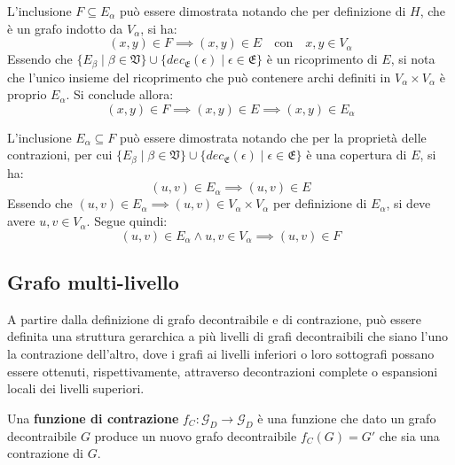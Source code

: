 L'inclusione $F \subseteq E_\alpha$ pu\`o essere dimostrata notando che per definizione di $H$,
che \`e un grafo indotto da $V_\alpha$, si ha:
\begin{equation*}
(x, y) \in F \implies (x, y) \in E \quad \text{con} \quad x, y \in V_{\alpha}
\end{equation*}
Essendo che $\{ E_\beta \mid \beta \in \mathfrak{V}\}
\cup \{ dec_{\mathfrak{E}}(\epsilon) \mid \epsilon \in \mathfrak{E}\}$ \`e un ricoprimento di $E$, si nota che
l'unico insieme del ricoprimento che pu\`o contenere archi definiti in $V_\alpha \times V_\alpha$
\`e proprio $E_\alpha$. Si conclude allora:
\begin{equation*}
(x, y) \in F \implies (x, y) \in E \implies (x, y) \in E_\alpha
\end{equation*}

L'inclusione $E_\alpha \subseteq F$ pu\`o essere dimostrata notando che per la propriet\`a delle contrazioni,
per cui $\{ E_\beta \mid \beta \in \mathfrak{V}\} \cup
\{dec_{\mathfrak{E}}(\epsilon) \mid \epsilon \in \mathfrak{E}\} $ \`e una copertura di $E$, si ha:
\begin{equation*}
    (u, v) \in E_\alpha \implies (u, v) \in E
\end{equation*}
Essendo che  $(u, v) \in E_\alpha \implies (u, v) \in V_\alpha \times V_\alpha$ per definizione di $E_\alpha$, si
deve avere $u, v \in V_\alpha$. Segue quindi:
\begin{equation*}
(u, v) \in E_\alpha \land u,v \in V_\alpha \implies (u, v) \in F
\end{equation*}

\newpage

\subsection{Grafo multi-livello}\label{subsec:grafo-multi-livello}

A partire dalla definizione di grafo decontraibile e di contrazione, pu\`o essere definita una struttura gerarchica
a pi\`u livelli di grafi decontraibili che siano l'uno la contrazione dell'altro, dove i grafi ai livelli inferiori
o loro sottografi possano essere ottenuti, rispettivamente, attraverso decontrazioni complete o espansioni locali
dei livelli superiori.


\begin{definition} 
Una \textbf{funzione di contrazione} $f_C : \mathcal{G}_D \rightarrow \mathcal{G}_D$ \`e una funzione che dato un
grafo decontraibile $G$ produce un nuovo grafo decontraibile $f_C(G) = G'$ che sia una contrazione di $G$.
\end{definition}

